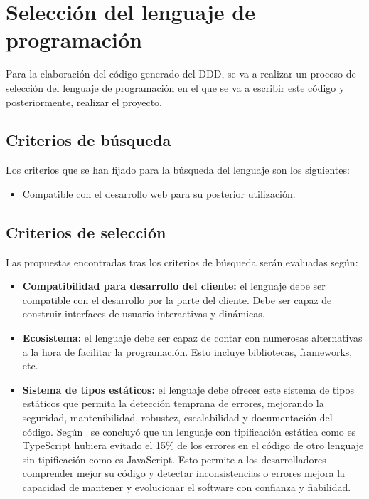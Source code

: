 \section{Selección del lenguaje de programación}

Para la elaboración del código generado del DDD, se va a realizar un proceso de selección del lenguaje de programación en el que se va a escribir este código y posteriormente, realizar el proyecto.

\subsection{Criterios de búsqueda}

Los criterios que se han fijado para la búsqueda del lenguaje son los siguientes:

\begin{itemize}
    \item Compatible con el desarrollo web para su posterior utilización.
\end{itemize}

\subsection{Criterios de selección}

Las propuestas encontradas tras los criterios de búsqueda serán evaluadas según:

\begin{itemize}
    \item \textbf{Compatibilidad para desarrollo del cliente:} el lenguaje debe ser compatible con el desarrollo por la parte del cliente. Debe ser capaz de construir interfaces de usuario interactivas y dinámicas.
    \item \textbf{Ecosistema:} el lenguaje debe ser capaz de contar con numerosas alternativas a la hora de facilitar la programación. Esto incluye bibliotecas, frameworks, etc.
    \item \textbf{Sistema de tipos estáticos:} el lenguaje debe ofrecer este sistema de tipos estáticos que permita la detección temprana de errores, mejorando la seguridad, mantenibilidad, robustez, escalabilidad y documentación del código. Según~\cite{gao2017type} se concluyó que un lenguaje con tipificación estática como es TypeScript hubiera evitado el 15\% de los errores en el código de otro lenguaje sin tipificación como es JavaScript. Esto permite a los desarrolladores comprender mejor su código y detectar inconsistencias o errores mejora la capacidad de mantener y evolucionar el software con confianza y fiabilidad.
\end{itemize}

